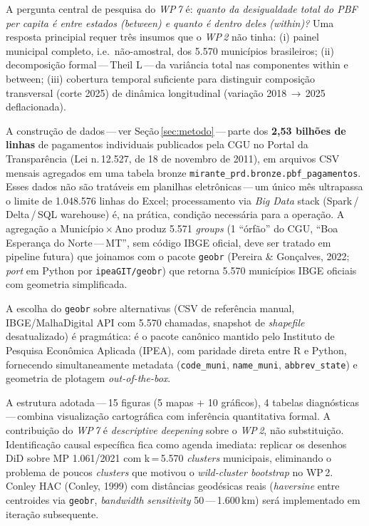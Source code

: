 \documentclass[12pt,a4paper,oneside]{article}
\begin{document}
A pergunta central de pesquisa do \textit{WP\,7} é: \textit{quanto da
desigualdade total do PBF per capita é entre estados (\textit{between}) e
quanto é dentro deles (\textit{within})?} Uma resposta principial requer
três insumos que o \textit{WP\,2} não tinha: (i) painel municipal completo,
i.e.\ não-amostral, dos 5.570 municípios brasileiros; (ii) decomposição
formal\,---\,Theil L\,---\,da variância total nas componentes within e between;
(iii) cobertura temporal suficiente para distinguir composição transversal
(corte 2025) de dinâmica longitudinal (variação 2018\,$\rightarrow$\,2025
deflacionada).

A construção de dados\,---\,ver Seção\,\ref{sec:metodo}\,---\,parte dos
\textbf{2{,}53 bilhões de linhas} de pagamentos individuais publicados pela
CGU no Portal da Transparência (Lei n.\,12.527, de 18 de novembro de 2011),
em arquivos CSV mensais agregados em uma tabela bronze
\texttt{mirante\_prd.bronze.pbf\_pagamentos}. Esses dados não são tratáveis
em planilhas eletrônicas\,---\,um único mês ultrapassa o limite de
1.048.576 linhas do Excel; processamento via \textit{Big Data} stack
(Spark\,/\,Delta\,/\,SQL warehouse) é, na prática, condição necessária para
a operação. A agregação a Município\,$\times$\,Ano produz 5.571
\textit{groups} (1 ``órfão'' do CGU, ``Boa Esperança do Norte\,---\,MT'',
sem código IBGE oficial, deve ser tratado em pipeline futura) que
joinamos com o pacote \texttt{geobr} (Pereira \& Gonçalves, 2022; \textit{port}
em Python por \texttt{ipeaGIT/geobr}) que retorna 5.570 municípios IBGE
oficiais com geometria simplificada.

A escolha do \texttt{geobr} sobre alternativas (CSV de referência manual,
IBGE/MalhaDigital API com 5.570 chamadas, snapshot de \textit{shapefile}
desatualizado) é pragmática: é o pacote canônico mantido pelo Instituto de
Pesquisa Econômica Aplicada (IPEA), com paridade direta entre R e Python,
fornecendo simultaneamente metadata (\texttt{code\_muni},
\texttt{name\_muni}, \texttt{abbrev\_state}) e geometria de plotagem
\textit{out-of-the-box}.

A estrutura adotada\,---\,15 figuras (5 mapas + 10 gráficos), 4 tabelas
diagnósticas\,---\,combina visualização cartográfica com inferência
quantitativa formal. A contribuição do \textit{WP\,7} é \textit{descriptive
deepening} sobre o \textit{WP\,2}, não substituição. Identificação causal
específica fica como agenda imediata: replicar os desenhos DiD sobre MP
1.061/2021 com k\,=\,5.570 \textit{clusters} municipais, eliminando o problema
de poucos \textit{clusters} que motivou o \textit{wild-cluster bootstrap} no
WP\,2. Conley HAC (Conley, 1999) com distâncias geodésicas reais
(\textit{haversine} entre centroides via \texttt{geobr}, \textit{bandwidth}
\textit{sensitivity} 50\,---\,1.600\,km) será implementado em iteração
subsequente.
\end{document}
